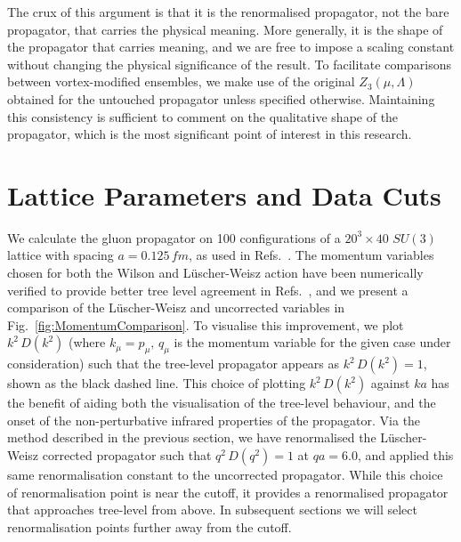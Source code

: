 The crux of this argument is that it is the renormalised propagator, not the bare propagator, that carries the physical meaning.  More generally, it is the shape of the propagator that carries meaning, and we are free to impose a scaling constant without changing the physical significance of the result. To facilitate comparisons between vortex-modified ensembles, we make use of the original $Z_3(\mu, \Lambda)$ obtained for the untouched propagator unless specified otherwise. Maintaining this consistency is sufficient to comment on the qualitative shape of the propagator, which is the most significant point of interest in this research.\\

\section{Lattice Parameters and Data Cuts} \label{sec:LatticeParameters}
We calculate the gluon propagator on 100 configurations of a $20^3\times 40$ $SU(3)$ lattice with spacing $a=0.125\,\si{fm}$, as used in Refs.~\cite{Trewartha:2015nna,OMalley:2011aa}. The momentum variables chosen for both the Wilson and L\"uscher-Weisz action have been numerically verified to provide better tree level agreement in Refs.~\cite{Marenzoni:1994ap, Bonnet:2001uh}, and we present a comparison of the L\"uscher-Weisz and uncorrected variables in Fig.~\ref{fig:MomentumComparison}. To visualise this improvement, we plot $k^2\,D(k^2)$ (where $k_\mu=p_\mu,\,q_\mu$ is the momentum variable for the given case under consideration) such that the tree-level propagator appears as $k^2\,D(k^2)=1$, shown as the black dashed line. This choice of plotting $k^2\,D(k^2)$ against $ka$ has the benefit of aiding both the visualisation of the tree-level behaviour, and the onset of the non-perturbative infrared properties of the propagator. Via the method described in the previous section, we have renormalised the L\"uscher-Weisz corrected propagator such that $q^2\,D(q^2) = 1$ at $qa=6.0$, and applied this same renormalisation constant to the uncorrected propagator. While this choice of renormalisation point is near the cutoff, it provides a renormalised propagator that approaches tree-level from above. In subsequent sections we will select renormalisation points further away from the cutoff.\\

